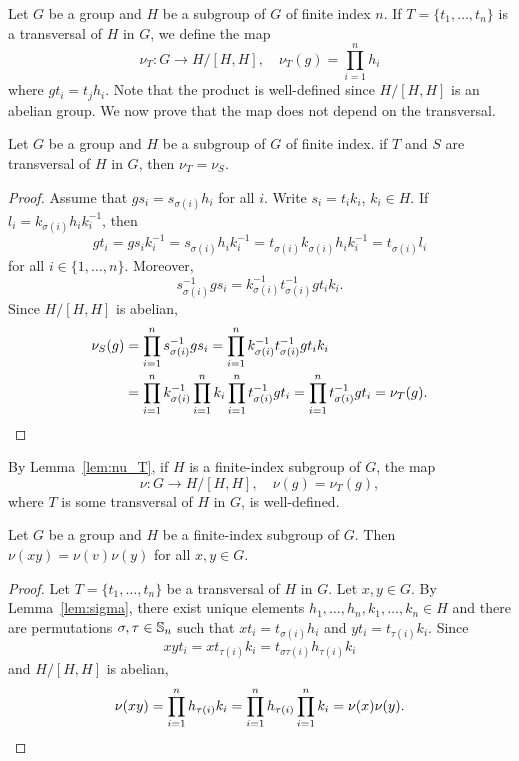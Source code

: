 Let $G$ be a group and $H$ be a subgroup of $G$ of finite index $n$. If
$T=\{t_1,\dots,t_n\}$ is a transversal of $H$ in $G$, we define the map 
	\[
		\nu_T\colon G\to H/[H,H],\quad
		\nu_T(g)=\prod_{i=1}^n h_i
	\]
where $gt_i=t_jh_i$. Note that the product is well-defined since $H/[H,H]$ is an abelian group. 
We now prove that the map does not depend on the 
transversal. 

\begin{lemma}
	\label{lem:nu_T}
	Let $G$ be a group and $H$ be a subgroup of $G$ of finite index. if $T$ 
	and $S$ are transversal of $H$ in $G$, then $\nu_T=\nu_S$.
\end{lemma}

\begin{proof}
	Assume that $gs_i=s_{\sigma(i)}h_i$ for all $i$. Write 
	$s_i=t_ik_i$, $k_i\in H$. If $l_i=k_{\sigma(i)}h_ik_i^{-1}$, then 
	\[
	gt_i=gs_ik_i^{-1}=s_{\sigma(i)}h_ik_i^{-1}=t_{\sigma(i)}k_{\sigma(i)}h_ik_i^{-1}=t_{\sigma(i)}l_i
	\]
	for all $i\in\{1,\dots,n\}$. Moreover,  
	\[
			s_{\sigma(i)}^{-1}gs_i=k_{\sigma(i)}^{-1}t_{\sigma(i)}^{-1}gt_ik_i.
	\]
	Since $H/[H,H]$ is abelian, 
	\begin{align*}
		\nu_S(g)
		&=\prod_{i=1}^n s_{\sigma(i)}^{-1}gs_i
		=\prod_{i=1}^n k_{\sigma(i)}^{-1}t_{\sigma(i)}^{-1}gt_ik_i\\
		&=\prod_{i=1}^n k_{\sigma(i)}^{-1}\prod_{i=1}^n k_i\prod_{i=1}^n t_{\sigma(i)}^{-1}gt_i
		=\prod_{i=1}^n t_{\sigma(i)}^{-1}gt_i
		=\nu_T(g).\qedhere
	\end{align*}
\end{proof}

By Lemma~\ref{lem:nu_T}, if $H$ is a finite-index subgroup of $G$, the map 
\[
\nu\colon G\to H/[H,H],
\quad
\nu(g)=\nu_T(g),
\]
where $T$ is some transversal of $H$ in $G$, is well-defined. 

\begin{theorem}
	\label{theorem:transfer}
	Let $G$ be a group and $H$ be a finite-index subgroup of $G$. Then $\nu(xy)=\nu(v)\nu(y)$ 
	for all $x,y\in G$.
\end{theorem}

\begin{proof}
	Let $T=\{t_1,\dots,t_n\}$ be a transversal of $H$ in $G$. Let $x,y\in G$. By 
	Lemma~\ref{lem:sigma}, there exist unique elements $h_1,\dots,h_n,k_1,\dots,k_n\in H$ and 
	there are permutations $\sigma,\tau\in\mathbb{S}_n$ such that $xt_i=t_{\sigma(i)}h_i$ and 
	$yt_i=t_{\tau(i)}k_i$. Since 
	\[
	xyt_i=xt_{\tau(i)}k_i=t_{\sigma\tau(i)}h_{\tau(i)}k_i
	\]
	and $H/[H,H]$ is abelian, 
	\[
		\nu(xy)=\prod_{i=1}^n h_{\tau(i)}k_i=\prod_{i=1}^n h_{\tau(i)}\prod_{i=1}^n k_i=\nu(x)\nu(y).\qedhere
	\]
\end{proof}


